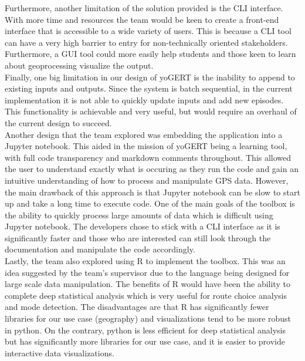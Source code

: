 \documentclass[12pt, titlepage]{article}
\begin{document}
\noindent Furthermore, another limitation of the solution provided is the CLI interface. With more time and resources the team would be keen to create a front-end interface that is accessible to a wide variety of users. This is because a CLI tool can have a very high barrier to entry for non-technically oriented stakeholders. Furthermore, a GUI tool could more easily help students and those keen to learn about geoprocessing visualize the output.\\

\noindent Finally, one big limitation in our design of yoGERT is the inability to append to existing inputs and outputs. Since the system is batch sequential, in the current implementation it is not able to quickly update inputs and add new episodes. This functionality is achievable and very useful, but would require an overhaul of the current design to succeed. \\

\noindent Another design that the team explored was embedding the application into a Jupyter notebook. This aided in the mission of yoGERT being a learning tool, with full code transparency and markdown comments throughout. This allowed the user to understand exactly what is occuring as they run the code and gain an intuitive understanding of how to process and manipulate GPS data. However, the main drawback of this approach is that Jupyter notebook can be slow to start up and take a long time to execute code. One of the main goals of the toolbox is the ability to quickly process large amounts of data which is difficult using Jupyter notebook. The developers chose to stick with a CLI interface as it is significantly faster and those who are interested can still look through the documentation and manipulate the code accordingly. \\

\noindent Lastly, the team also explored using R to implement the toolbox. This was an idea suggested by the team's supervisor due to the language being designed for large scale data manipulation. The benefits of R would have been the ability to complete deep statistical analysis which is very useful for route choice analysis and mode detection. The disadvantages are that R has significantly fewer libraries for our use case (geography) and visualizations tend to be more robust in python. On the contrary, python is less efficient for deep statistical analysis but has significantly more libraries for our use case, and it is easier to provide interactive data visualizations. \\
\end{document}
